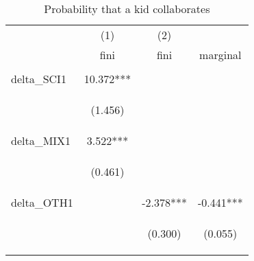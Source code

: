 \documentclass{article} %
\begin{document}
\begin{table}[H]
\end{table}

\begin{table}[H]
\caption{Probability that a kid collaborates} \label{tab:behav_results}


\begin{center}
\begin{tabular}{lccc} \hline
 & (1) & (2) \\
 & fini & fini & marginal \\ \hline
\vspace{4pt} & \begin{footnotesize}\end{footnotesize} & \begin{footnotesize}\end{footnotesize} & \begin{footnotesize}\end{footnotesize} \\
delta\_SCI1 & 10.372*** &  &  \\
\vspace{4pt} & \begin{footnotesize}(1.456)\end{footnotesize} & \begin{footnotesize}\end{footnotesize} & \begin{footnotesize}\end{footnotesize} \\
delta\_MIX1 & 3.522*** &  &  \\
\vspace{4pt} & \begin{footnotesize}(0.461)\end{footnotesize} & \begin{footnotesize}\end{footnotesize} & \begin{footnotesize}\end{footnotesize} \\
delta\_OTH1 &  & -2.378*** & -0.441*** \\
\vspace{4pt} & \begin{footnotesize}\end{footnotesize} & \begin{footnotesize}(0.300)\end{footnotesize} & \begin{footnotesize}(0.055)\end{footnotesize} \\

\end{tabular}
\end{center}
\end{table}
\end{document}
